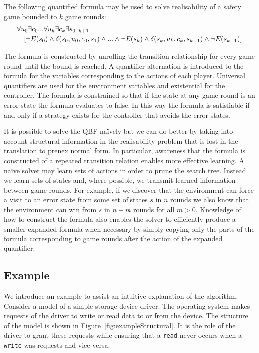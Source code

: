 The following quantified formula may be used to solve realisability of a safety game bounded to $k$ game rounds: 
\begin{equation*}
    \begin{multlined}
        \forall u_0 \exists c_0 ... \forall u_k \exists c_k \exists s_{0..k+1} \\
        \shoveright{[\lnot E(s_0) \land \delta(s_0, u_0, c_0, s_1) \land ... \land \lnot E(s_k) \land \delta(s_k, u_k, c_k, s_{k+1}) \land \lnot E(s_{k+1})]}
    \end{multlined}
\end{equation*}

The formula is constructed by unrolling the transition relationship for every game round until the bound is reached. A quantifier alternation is introduced to the formula for the variables corresponding to the actions of each player. Universal quantifiers are used for the environment variables and existential for the controller. The formula is constrained so that if the state at any game round is an error state the formula evaluates to false. In this way the formula is satisfiable if and only if a strategy exists for the controller that avoids the error states.

It is possible to solve the QBF na\"ively but we can do better by taking into account structural information in the realisability problem that is lost in the translation to prenex normal form. In particular, awareness that the formula is constructed of a repeated transition relation enables more effective learning. A na\"ive solver may learn sets of actions in order to prune the search tree. Instead we learn sets of states and, where possible, we transmit learned information between game rounds. For example, if we discover that the environment can force a visit to an error state from some set of states $s$ in $n$ rounds we also know that the environment can win from $s$ in $n+m$ rounds for all $m > 0$. Knowledge of how to construct the formula also enables the solver to efficiently produce a smaller expanded formula when necessary by simply copying only the parts of the formula corresponding to game rounds after the action of the expanded quantifier.

\subsection{Example}
\label{sec:boundedexample}

We introduce an example to assist an intuitive explanation of the algorithm. Consider a model of a simple storage device driver. The operating system makes requests of the driver to write or read data to or from the device. The structure of the model is shown in Figure~\ref{fig:exampleStructural}. It is the role of the driver to grant these requests while ensuring that a \texttt{read} never occurs when a \texttt{write} was requests and vice versa.

